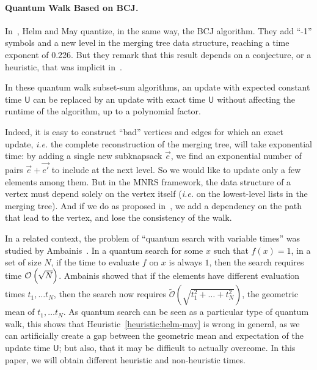 \paragraph{Quantum Walk Based on BCJ.}
In~\cite{DBLP:conf/tqc/HelmM18}, Helm and May quantize, in the same way, the BCJ algorithm. They add ``-1'' symbols and a new level in the merging tree data structure, reaching a time exponent of 0.226. But they remark that this result depends on a conjecture, or a heuristic, that was implicit in~\cite{DBLP:conf/pqcrypto/BernsteinJLM13}.%

\begin{heuristic}\label{heuristic:helm-may}
In these quantum walk subset-sum algorithms, an update with expected constant time $\mathsf{U}$ can be replaced by an update with exact time $\mathsf{U}$ without affecting the runtime of the algorithm, up to a polynomial factor.
\end{heuristic}

Indeed, it is easy to construct ``bad'' vertices and edges for which an exact update, \emph{i.e.} the complete reconstruction of the merging tree, will take exponential time: by adding a single new subknapsack $\vec{e}$, we find an exponential number of pairs $\vec{e} + \vec{e'}$ to include at the next level. So we would like to update only a few elements among them. But in the MNRS framework, the data structure of a vertex must depend solely on the vertex itself (\emph{i.e.} on the lowest-level lists in the merging tree). And if we do as proposed in~\cite{DBLP:conf/pqcrypto/BernsteinJLM13}, we add a dependency on the path that lead to the vertex, and lose the consistency of the walk.

In a related context, the problem of ``quantum search with variable times'' was studied by Ambainis~\cite{DBLP:journals/mst/Ambainis10}. In a quantum search for some $x$ such that $f(x) = 1$, in a set of size $N$, if the time to evaluate $f$ on $x$ is always $1$, then the search requires time $\mathcal{O} \left(\sqrt{N} \right)$. Ambainis showed that if the elements have different evaluation times $t_1, \ldots t_N$, then the search now requires $\widetilde{\mathcal{O}}(\sqrt{ t_1^2 + \ldots + t_N^2 })$, the geometric mean of $t_1, \ldots t_N$. As quantum search can be seen as a particular type of quantum walk, this shows that Heuristic~\ref{heuristic:helm-may} is wrong in general, as we can artificially create a gap between the geometric mean and expectation of the update time $\mathsf{U}$; but also, that it may be difficult to actually overcome. In this paper, we will obtain different heuristic and non-heuristic times.


